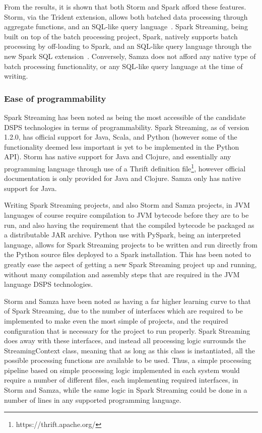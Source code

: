 From the results, it is shown that both Storm and Spark afford these features.
Storm, via the Trident extension, allows both batched data processing through aggregate functions, and an SQL-like query
language~\cite{web:storm-trident}. Spark Streaming, being built on top of the batch processing project, Spark, natively
supports batch processing by off-loading to Spark, and an SQL-like query language through the new Spark SQL extension~\cite{web:sparksql}.
Conversely, Samza does not afford any native type of batch processing functionality, or any SQL-like query language at
the time of writing.


\subsubsection{Ease of programmability}

Spark Streaming has been noted as being the most accessible of the candidate DSPS technologies in terms of programmability.
Spark Streaming, as of version 1.2.0, has official support for Java, Scala, and Python (however some of the functionality deemed
less important is yet to be implemented in the Python API). Storm has native support for Java and Clojure, and essentially
any programming language through use of a Thrift definition file\footnote{https://thrift.apache.org/}, however official
documentation is only provided for Java and Clojure. Samza only has native support for Java.

Writing Spark Streaming projects, and also Storm and Samza projects,
in JVM languages of course require compilation to JVM bytecode before they are to be run, and also having the requirement
that the compiled bytecode be packaged as a distributable JAR archive. Python use with PySpark, being an
interpreted language, allows for Spark Streaming projects to be written and run directly from the Python source files
deployed to a Spark installation. This has been noted to greatly ease the aspect of getting a new Spark Streaming project
up and running, without many compilation and assembly steps that are required in the JVM language DSPS technologies.

Storm and Samza have been noted as having a far higher learning curve to that of Spark Streaming, due to the number of
interfaces which are required to be implemented to make even the most simple of projects, and the required configuration
that is necessary for the project to run properly. Spark Streaming does away with these interfaces, and instead all processing
logic surrounds the StreamingContext class, meaning that as long as this class is instantiated, all the possible processing
functions are available to be used. Thus, a simple processing pipeline based on simple processing logic implemented in each
system would require a number of different files, each implementing required interfaces, in Storm and Samza, while the
same logic in Spark Streaming could be done in a number of lines in any supported programming language.

